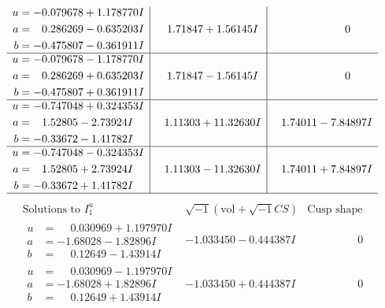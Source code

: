 \documentclass[1p]{elsarticle_modified}
\theoremstyle{definition}
\newcommand{\I}{\sqrt{-1}}
\begin{document}
$$\begin{array}{c|c|c}
\begin{aligned}
u &= -0.079678 + 1.178770 I \\
a &= \phantom{-}0.286269 - 0.635203 I \\
b &= -0.475807 - 0.361911 I\end{aligned}
 & \phantom{-}1.71847 + 1.56145 I & \phantom{-0.000000 } 0 \\ \hline\begin{aligned}
u &= -0.079678 - 1.178770 I \\
a &= \phantom{-}0.286269 + 0.635203 I \\
b &= -0.475807 + 0.361911 I\end{aligned}
 & \phantom{-}1.71847 - 1.56145 I & \phantom{-0.000000 } 0 \\ \hline\begin{aligned}
u &= -0.747048 + 0.324353 I \\
a &= \phantom{-}1.52805 - 2.73924 I \\
b &= -0.33672 - 1.41782 I\end{aligned}
 & \phantom{-}1.11303 + 11.32630 I & \phantom{-}1.74011 - 7.84897 I \\ \hline\begin{aligned}
u &= -0.747048 - 0.324353 I \\
a &= \phantom{-}1.52805 + 2.73924 I \\
b &= -0.33672 + 1.41782 I\end{aligned}
 & \phantom{-}1.11303 - 11.32630 I & \phantom{-}1.74011 + 7.84897 I\\
 \hline 
 \end{array}$$\newpage$$\begin{array}{c|c|c}  
\text{Solutions to }I^u_{1}& \I (\text{vol} + \sqrt{-1}CS) & \text{Cusp shape}\\
 \hline 
\begin{aligned}
u &= \phantom{-}0.030969 + 1.197970 I \\
a &= -1.68028 - 1.82896 I \\
b &= \phantom{-}0.12649 - 1.43914 I\end{aligned}
 & -1.033450 - 0.444387 I & \phantom{-0.000000 } 0 \\ \hline\begin{aligned}
u &= \phantom{-}0.030969 - 1.197970 I \\
a &= -1.68028 + 1.82896 I \\
b &= \phantom{-}0.12649 + 1.43914 I\end{aligned}
 & -1.033450 + 0.444387 I & \phantom{-0.000000 } 0 \\ \hline\begin{aligned}

\end{aligned}
\end{array}$$
\end{document}
